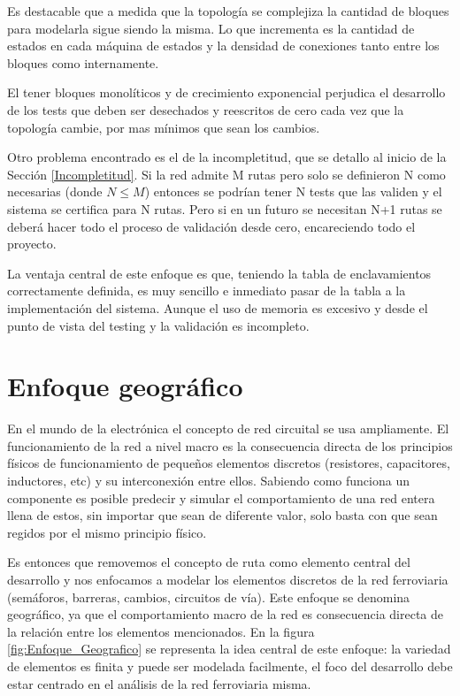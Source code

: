 	Es destacable que a medida que la topología se complejiza la cantidad de bloques para modelarla sigue siendo la misma. Lo que incrementa es la cantidad de estados en cada máquina de estados y la densidad de conexiones tanto entre los bloques como internamente.
	
	El tener bloques monolíticos y de crecimiento exponencial perjudica el desarrollo de los tests que deben ser desechados y reescritos de cero cada vez que la topología cambie, por mas mínimos que sean los cambios. 
	
	Otro problema encontrado es el de la incompletitud, que se detallo al inicio de la Sección \ref{Incompletitud}. Si la red admite M rutas pero solo se definieron N como necesarias (donde $N \leq M$) entonces se podrían tener N tests que las validen y el sistema se certifica para N rutas. Pero si en un futuro se necesitan N+1 rutas se deberá hacer todo el proceso de validación desde cero, encareciendo todo el proyecto.
			
	La ventaja central de este enfoque es que, teniendo la tabla de enclavamientos correctamente definida, es muy sencillo e inmediato pasar de la tabla a la implementación del sistema. Aunque el uso de memoria es excesivo y desde el punto de vista del testing y la validación es incompleto.			
					
\section{Enfoque geográfico}

	En el mundo de la electrónica el concepto de red circuital se usa ampliamente. El funcionamiento de la red a nivel macro es la consecuencia directa de los principios físicos de funcionamiento de pequeños elementos discretos (resistores, capacitores, inductores, etc) y su interconexión entre ellos. Sabiendo como funciona un componente es posible predecir y simular el comportamiento de una red entera llena de estos, sin importar que sean de diferente valor, solo basta con que sean regidos por el mismo principio físico.
	
	Es entonces que removemos el concepto de ruta como elemento central del desarrollo y nos enfocamos a modelar los elementos discretos de la red ferroviaria (semáforos, barreras, cambios, circuitos de vía). Este enfoque se denomina geográfico, ya que el comportamiento macro de la red es consecuencia directa de la relación entre los elementos mencionados. En la figura \ref{fig:Enfoque_Geografico} se representa la idea central de este enfoque: la variedad de elementos es finita y puede ser modelada facilmente, el foco del desarrollo debe estar centrado en el análisis de la red ferroviaria misma.
	
